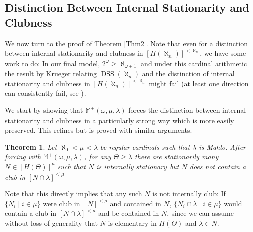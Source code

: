 \documentclass[12pt]{amsart}
\theoremstyle{definition}
\theoremstyle{remark}
\theoremstyle{plain}
\newtheorem{mysen}[mydef]{Theorem}
\numberwithin{mydef}{section}
\DeclareMathOperator{\DSS}{DSS}
\newcommand{\dM}{\mathbb{M}}
\begin{document}
	\subsection{Distinction Between Internal Stationarity and Clubness}\hfill
	
	We now turn to the proof of Theorem \ref{Thm2}. Note that even for a distinction between internal stationarity and clubness in $[H(\aleph_n)]^{<\aleph_n}$, we have some work to do: In our final model, $2^{\omega}\geq\aleph_{\omega+1}$ and under this cardinal arithmetic the result by Krueger relating $\DSS(\aleph_n)$ and the distinction of internal stationarity and clubness in $[H(\aleph_n)]^{<\aleph_n}$ might fail (at least one direction can consistently fail, see \cite{JakobCascadingVariants}).
	
	We start by showing that $\dM^+(\omega,\mu,\lambda)$ forces the distinction between internal stationarity and clubness in a particularly strong way which is more easily preserved. This refines \cite[Lemma 29]{LevineDisjointStatSeq} but is proved with similar arguments.
	
	\begin{mysen}\label{BetterDist}
		Let $\aleph_0<\mu<\lambda$ be regular cardinals such that $\lambda$ is Mahlo. After forcing with $\dM^+(\omega,\mu,\lambda)$, for any $\Theta\geq\lambda$ there are stationarily many $N\in[H(\Theta)]^{\mu}$ such that $N$ is internally stationary but $N$ does not contain a club in $[N\cap\lambda]^{<\mu}$
	\end{mysen}
	
	Note that this directly implies that any such $N$ is not internally club: If $\{N_i\;|\;i\in\mu\}$ were club in $[N]^{<\mu}$ and contained in $N$, $\{N_i\cap\lambda\;|\;i\in\mu\}$ would contain a club in $[N\cap\lambda]^{<\mu}$ and be contained in $N$, since we can assume without loss of generality that $N$ is elementary in $H(\Theta)$ and $\lambda\in N$.
	
\end{document}
